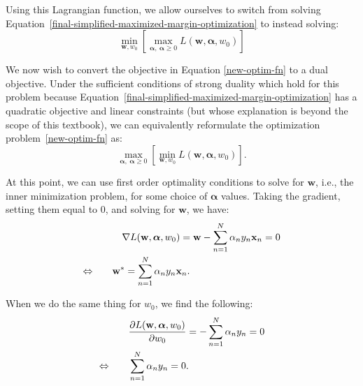 \fi

Using this Lagrangian function, we allow ourselves to switch from solving Equation~\ref{final-simplified-maximized-margin-optimization} to instead solving:
%
\begin{equation} \label{new-optim-fn}
	\underset{\textbf{w}, w_{0}}{\min}\left[ \max_{\boldsymbol{\alpha} , \ \boldsymbol{\alpha} \geq 0} L(\textbf{w},  \boldsymbol{\alpha},w_0)\right]
\end{equation}


We now wish to convert the objective in Equation \ref{new-optim-fn} to a dual objective. Under the sufficient conditions of strong duality which hold for this problem because Equation~\ref{final-simplified-maximized-margin-optimization} has a quadratic objective and linear constraints (but whose explanation is beyond the scope of this textbook), we can equivalently reformulate the optimization problem~\eqref{new-optim-fn} as:
%
%
\begin{equation} \label{dual-objective}
	\max_{\boldsymbol{\alpha}, \ \boldsymbol{\alpha} \geq 0} \left[\underset{\textbf{w}, w_{0}}{\min} L(\textbf{w},  \boldsymbol{\alpha},w_0)\right].
      \end{equation}
      
      At this point, we can use first order optimality conditions to  solve
      for  $\mathbf{w}$, i.e., the inner minimization problem, for some choice of  $\boldsymbol{\alpha}$ values.
      Taking the gradient, setting them equal to 0, and solving for $\textbf{w}$, we have:
\begin{align}
  & \quad \nabla L(\textbf{w},  \boldsymbol{\alpha},w_0)= \textbf{w} - \sum_{n=1}^{N} \alpha_{n} y_{n} \textbf{x}_{n} = 0
  \notag  \\
\Leftrightarrow \quad\quad &	\textbf{w}^{*} = \sum_{n=1}^{N} \alpha_{n} y_{n} \textbf{x}_{n}. \label{solve-for-w}
\end{align}

When we do the same thing for $w_{0}$, we find the following:
\begin{align}
\quad &	\frac{\partial L(\textbf{w},  \boldsymbol{\alpha},w_0)}{\partial w_{0}} = - \sum_{n=1}^{N} \alpha_{n} y_{n} = 0 \notag\\
\Leftrightarrow
\quad\quad & 	\sum_{n=1}^{N} \alpha_{n} y_{n} = 0. \label{solve-for-w0}
        \end{align}

